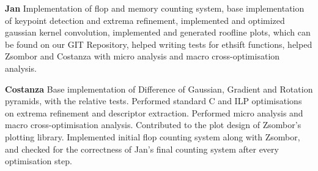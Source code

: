 \documentclass[letterpaper]{article}
\begin{document}
\textbf{Jan} Implementation of flop and memory counting system, base implementation of keypoint detection and extrema refinement, implemented and optimized gaussian kernel convolution, implemented and generated roofline plots, which can be found on our GIT Repository, helped writing tests for ethsift functions, helped Zsombor and Costanza with micro analysis and macro cross-optimisation analysis.
 
\textbf{Costanza} Base implementation of Difference of Gaussian, Gradient and Rotation pyramids, with the relative tests. Performed standard C and ILP optimisations on extrema refinement and descriptor extraction. Performed micro analysis and macro cross-optimisation analysis. Contributed to the plot design of Zsombor's plotting library. Implemented initial flop counting system along with Zsombor, and checked for the correctness of Jan's final counting system after every optimisation step. 


\end{document}
